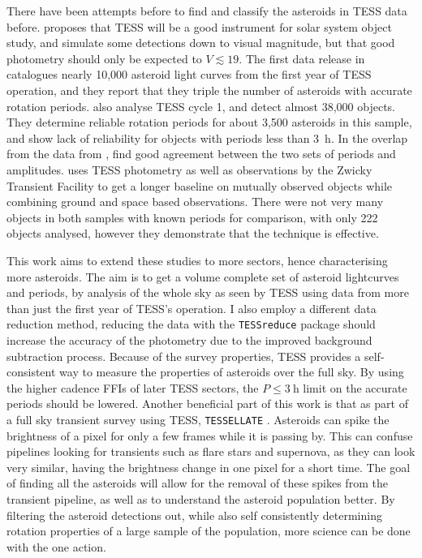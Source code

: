 \documentclass[12pt]{article}
\begin{document}
There have been attempts before to find and classify the asteroids in TESS data before.
\citet{Pal2018} proposes that TESS will be a good instrument for solar system object study, and simulate some detections down to  visual magnitude, but that good photometry should only be expected to $V \lesssim 19$.
The first data release in \citet{Pal2020} catalogues nearly 10,000 asteroid light curves from the first year of TESS operation, and they report that they triple the number of asteroids with accurate rotation periods.
\citet{McNeill2023} also analyse TESS cycle 1, and detect almost 38,000 objects.
They determine reliable rotation periods for about 3,500 asteroids in this sample, and show lack of reliability for objects with periods less than \qty{3}{\hour}.
In the overlap from the data from \citet{Pal2020}, \citeauthor{McNeill2023} find good agreement between the two sets of periods and amplitudes.
\citet{Gowanlock2024} uses TESS photometry as well as  observations by the Zwicky Transient Facility \citep[ZTF, ][]{Bellm2018} to get a longer baseline on mutually observed objects while combining ground and space based observations.
There were not very many objects in both samples with known periods for comparison, with only 222 objects analysed, however they demonstrate that the technique is effective.

This work aims to extend these studies to more sectors, hence characterising more asteroids.
The aim is to get a volume complete set of asteroid lightcurves and periods, by analysis of the whole sky as seen by TESS using data from more than just the first year of TESS's operation.
I also employ a different data reduction method, reducing the data with the \texttt{TESSreduce} package \citep{Ridden-Harper2021} should increase the accuracy of the photometry due to the improved background subtraction process.
Because of the survey properties, TESS provides a self-consistent way to measure the properties of asteroids over the full sky.
By using the higher cadence FFIs of later TESS sectors, the $P\leq\qty{3}{\hour}$ limit on the accurate periods \citep[as found by ][]{McNeill2023} should be lowered.
Another beneficial part of this work is that as part of a full sky transient survey using TESS, \texttt{TESSELLATE} \citep{TESSELLATE}.
Asteroids can spike the brightness of a pixel for only a few frames while it is passing by.
This can confuse pipelines looking for  transients such as flare stars and supernova, as they can look very similar, having the brightness change in one pixel for a short time.
The goal of finding all the asteroids will allow for the removal of these spikes from the transient pipeline, as well as to understand the asteroid population better.
By filtering the asteroid detections out, while also self consistently determining rotation properties of a large sample of the population, more science can be done with the one action.
\end{document}
